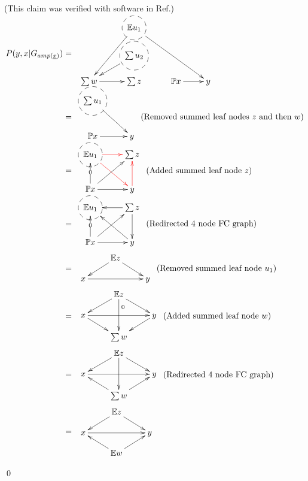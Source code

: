 \begin{claim}
\label{cl-decNapkin}
\decNapkin
\end{claim}
\proof 
(This claim was verified with software in 
Ref.\cite{dag-iden-detector})
{\allowdisplaybreaks
\begin{align}
P(y, x|G_{amp(\rvx)})
&=
\bcen
\xymatrix@R=1pc@C=2pc{
&*++[F-o]{\EE u_1}\ar[ddl]\ar[ddrr]
&&
\\
&*++[F-o]{\sum u_2}\ar[dl]
&&
\\
\sum w\ar[r]
&\sum z
&\PP x\ar[r]
&y
}\ecen
\\
&=
\bcen \xymatrix{
*++[F-o]{\sum u_1}
\ar[dr]
\\
\PP x \ar[r]
&  y}
\ecen
\text{(Removed summed leaf nodes $z$ and then $w$)}
\\
&=
\bcen \xymatrix{
*++[F-o]{\EE u_1}
\ar@[red][dr]\ar@[red][r]
&\sum z
\\
\PP x \ar[r]
\ar[u]|0
\ar[ru]
&  y\ar@[red][u]
}\ecen
(\text{Added summed leaf node $z$})
\\
&=
\bcen \xymatrix{
*++[F-o]{\EE u_1}
\ar@{<-}[dr]
\ar@{<-}[r]
&\sum z
\\
\PP x \ar[r]
\ar[u]|0
\ar[ru]
&  y\ar@{<-}[u]
}
\ecen
\text{(Redirected 4 node FC graph)}
\\
&=
\bcen
\xymatrix@R=1pc{
&\EE z
\ar[ld]\ar[rd]
\\
x \ar[rr]
&& y
}
\ecen
\text{(Removed summed leaf node $u_1$)}
\\
&=
\bcen
\xymatrix@R=1pc{
&\EE z\ar[dd]^<<<<0
\ar[ld]\ar[rd]
\\
x \ar[rr]
\ar[dr]
&& y
\ar[dl]
\\
& \sum w
}
\ecen
\text{(Added summed leaf node $w$)}
\\
&=
\bcen
\xymatrix@R=1pc{
&\EE z\ar[dd]
\ar[ld]\ar[rd]
\\
x \ar[rr]
&& y
\\
& \sum w
\ar[ur]\ar[ul]
}
\ecen
\text{(Redirected 4 node FC graph)}
\\
&=
\bcen
\xymatrix@R=1pc{
&\EE z
\ar[ld]\ar[rd]
\\
x \ar[rr]
&& y
\\
& \EE w
\ar[ur]\ar[ul]
}
\ecen
\end{align}
}

\qed


